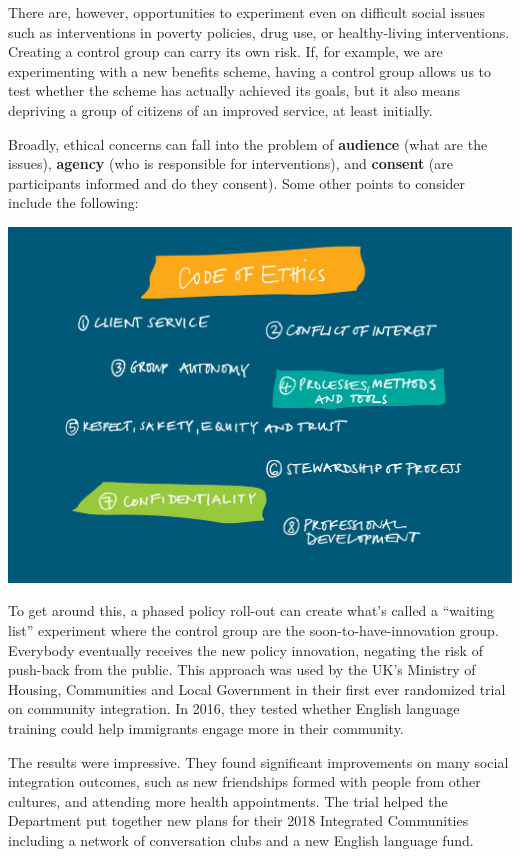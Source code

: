 \documentclass[openany]{book}
\begin{document}
There are, however, opportunities to experiment even on difficult social issues such as interventions in poverty policies, drug use, or healthy-living interventions. Creating a control group can carry its own risk. If, for example, we are experimenting with a new benefits scheme, having a control group allows us to test whether the scheme has actually achieved its goals, but it also means depriving a group of citizens of an improved service, at least initially.

Broadly, ethical concerns can fall into the problem of \textbf{audience} (what are the issues), \textbf{agency} (who is responsible for interventions), and \textbf{consent} (are participants informed and do they consent). Some other points to consider include the following:

\includegraphics{fig/CodeOfEthics.jpg}

To get around this, a phased policy roll-out can create what's called a ``waiting list'' experiment where the control group are the soon-to-have-innovation group. Everybody eventually receives the new policy innovation, negating the risk of push-back from the public. This approach was used by the UK's Ministry of Housing, Communities and Local Government in their first ever randomized trial on community integration. In 2016, they tested whether English language training could help immigrants engage more in their community.

The results were impressive. They found significant improvements on many social integration outcomes, such as new friendships formed with people from other cultures, and attending more health appointments. The trial helped the Department put together new plans for their 2018 Integrated Communities including a network of conversation clubs and a new English language fund.
\end{document}
